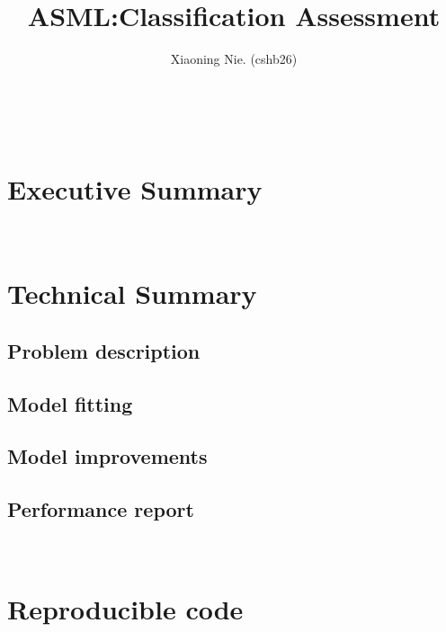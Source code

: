 \documentclass{article}
\title{ASML:Classification Assessment}
\author{Xiaoning Nie. (cshb26)}
\begin{document}
\maketitle

\ 


\section{Executive Summary}










\ 

\section{Technical Summary}

\subsection{Problem description}





\subsection{Model fitting}






\subsection{Model improvements}





\subsection{Performance report}







\ 

\section{Reproducible code}


\end{document}
